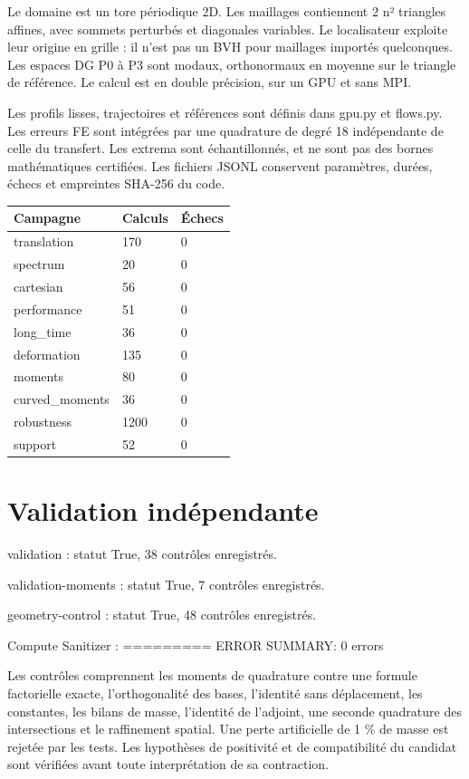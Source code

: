 \documentclass[10pt,a4paper]{article}
\begin{document}
Le domaine est un tore périodique 2D. Les maillages contiennent 2 n² triangles affines, avec sommets perturbés et diagonales variables. Le localisateur exploite leur origine en grille : il n'est pas un BVH pour maillages importés quelconques. Les espaces DG P0 à P3 sont modaux, orthonormaux en moyenne sur le triangle de référence. Le calcul est en double précision, sur un GPU et sans MPI.

Les profils lisses, trajectoires et références sont définis dans gpu.py et flows.py. Les erreurs FE sont intégrées par une quadrature de degré 18 indépendante de celle du transfert. Les extrema sont échantillonnés, et ne sont pas des bornes mathématiques certifiées. Les fichiers JSONL conservent paramètres, durées, échecs et empreintes SHA-256 du code.

\begin{center}\small\begin{tabular}{lll}\toprule
Campagne & Calculs & Échecs\\\midrule
translation & 170 & 0\\
spectrum & 20 & 0\\
cartesian & 56 & 0\\
performance & 51 & 0\\
long\_time & 36 & 0\\
deformation & 135 & 0\\
moments & 80 & 0\\
curved\_moments & 36 & 0\\
robustness & 1200 & 0\\
support & 52 & 0\\
\bottomrule\end{tabular}\end{center}
\section{Validation indépendante}
validation : statut True, 38 contrôles enregistrés.

validation-moments : statut True, 7 contrôles enregistrés.

geometry-control : statut True, 48 contrôles enregistrés.

Compute Sanitizer : ========= ERROR SUMMARY: 0 errors

Les contrôles comprennent les moments de quadrature contre une formule factorielle exacte, l'orthogonalité des bases, l'identité sans déplacement, les constantes, les bilans de masse, l'identité de l'adjoint, une seconde quadrature des intersections et le raffinement spatial. Une perte artificielle de 1 \% de masse est rejetée par les tests. Les hypothèses de positivité et de compatibilité du candidat sont vérifiées avant toute interprétation de sa contraction.
\end{document}
